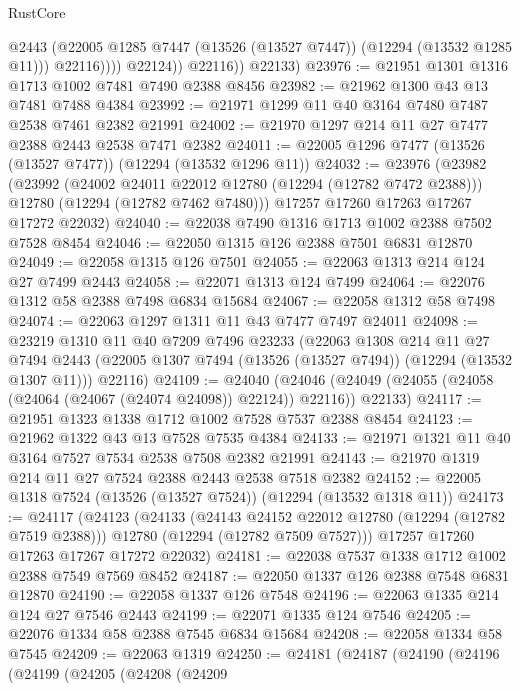 \begin{lexlean}{RustCore}
\begin{coremodule}
                      @2443
                      (@22005 @1285 @7447 (@13526 (@13527 @7447)) (@12294 (@13532 @1285 @11)))
                      @22116))))
              @22124))
          @22116))
      @22133)
@23976 := @21951 @1301 @1316 @1713 @1002 @7481 @7490 @2388 @8456
@23982 := @21962 @1300 @43 @13 @7481 @7488 @4384
@23992 := @21971 @1299 @11 @40 @3164 @7480 @7487 @2538 @7461 @2382 @21991
@24002 := @21970 @1297 @214 @11 @27 @7477 @2388 @2443 @2538 @7471 @2382
@24011 := @22005 @1296 @7477 (@13526 (@13527 @7477)) (@12294 (@13532 @1296 @11))
@24032 := @23976
    (@23982
      (@23992
        (@24002 @24011 @22012 @12780 (@12294 (@12782 @7472 @2388)))
        @12780
        (@12294 (@12782 @7462 @7480)))
      @17257
      @17260
      @17263
      @17267
      @17272
      @22032)
@24040 := @22038 @7490 @1316 @1713 @1002 @2388 @7502 @7528 @8454
@24046 := @22050 @1315 @126 @2388 @7501 @6831 @12870
@24049 := @22058 @1315 @126 @7501
@24055 := @22063 @1313 @214 @124 @27 @7499 @2443
@24058 := @22071 @1313 @124 @7499
@24064 := @22076 @1312 @58 @2388 @7498 @6834 @15684
@24067 := @22058 @1312 @58 @7498
@24074 := @22063 @1297 @1311 @11 @43 @7477 @7497 @24011
@24098 := @23219
    @1310
    @11
    @40
    @7209
    @7496
    @23233
    (@22063
      @1308
      @214
      @11
      @27
      @7494
      @2443
      (@22005 @1307 @7494 (@13526 (@13527 @7494)) (@12294 (@13532 @1307 @11)))
      @22116)
@24109 := @24040
    (@24046 (@24049 (@24055 (@24058 (@24064 (@24067 (@24074 @24098)) @22124)) @22116)) @22133)
@24117 := @21951 @1323 @1338 @1712 @1002 @7528 @7537 @2388 @8454
@24123 := @21962 @1322 @43 @13 @7528 @7535 @4384
@24133 := @21971 @1321 @11 @40 @3164 @7527 @7534 @2538 @7508 @2382 @21991
@24143 := @21970 @1319 @214 @11 @27 @7524 @2388 @2443 @2538 @7518 @2382
@24152 := @22005 @1318 @7524 (@13526 (@13527 @7524)) (@12294 (@13532 @1318 @11))
@24173 := @24117
    (@24123
      (@24133
        (@24143 @24152 @22012 @12780 (@12294 (@12782 @7519 @2388)))
        @12780
        (@12294 (@12782 @7509 @7527)))
      @17257
      @17260
      @17263
      @17267
      @17272
      @22032)
@24181 := @22038 @7537 @1338 @1712 @1002 @2388 @7549 @7569 @8452
@24187 := @22050 @1337 @126 @2388 @7548 @6831 @12870
@24190 := @22058 @1337 @126 @7548
@24196 := @22063 @1335 @214 @124 @27 @7546 @2443
@24199 := @22071 @1335 @124 @7546
@24205 := @22076 @1334 @58 @2388 @7545 @6834 @15684
@24208 := @22058 @1334 @58 @7545
@24209 := @22063 @1319
@24250 := @24181
    (@24187
      (@24190
        (@24196
          (@24199
            (@24205
              (@24208
                (@24209

\end{coremodule}
\end{lexlean}
